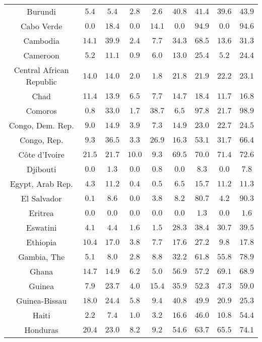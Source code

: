 \begin{longtable}{ccccccccc}
Burundi & $5.4$ & $5.4$ & $2.8$ & $2.6$ & $40.8$ & $41.4$ & $39.6$ & $43.9$ \\ 
Cabo Verde & $0.0$ & $18.4$ & $0.0$ & $14.1$ & $0.0$ & $94.9$ & $0.0$ & $94.6$ \\ 
Cambodia & $14.1$ & $39.9$ & $2.4$ & $7.7$ & $34.3$ & $68.5$ & $13.6$ & $31.3$ \\ 
Cameroon & $5.2$ & $11.1$ & $0.9$ & $6.0$ & $13.0$ & $25.4$ & $5.2$ & $24.4$ \\ 
Central African Republic & $14.0$ & $14.0$ & $2.0$ & $1.8$ & $21.8$ & $21.9$ & $22.2$ & $23.1$ \\ 
Chad & $11.4$ & $13.9$ & $6.5$ & $7.7$ & $14.7$ & $18.4$ & $11.7$ & $16.8$ \\ 
Comoros & $0.8$ & $33.0$ & $1.7$ & $38.7$ & $6.5$ & $97.8$ & $21.7$ & $98.9$ \\ 
Congo, Dem. Rep. & $9.0$ & $14.9$ & $3.9$ & $7.3$ & $14.9$ & $23.0$ & $22.7$ & $24.5$ \\ 
Congo, Rep. & $9.3$ & $36.5$ & $3.3$ & $26.9$ & $16.3$ & $53.1$ & $31.7$ & $66.4$ \\ 
Côte d'Ivoire & $21.5$ & $21.7$ & $10.0$ & $9.3$ & $69.5$ & $70.0$ & $71.4$ & $72.6$ \\ 
Djibouti & $0.0$ & $1.3$ & $0.0$ & $0.8$ & $0.0$ & $8.3$ & $0.0$ & $7.8$ \\ 
Egypt, Arab Rep. & $4.3$ & $11.2$ & $0.4$ & $0.5$ & $6.5$ & $15.7$ & $11.2$ & $11.3$ \\ 
El Salvador & $0.1$ & $8.6$ & $0.0$ & $3.8$ & $8.2$ & $80.7$ & $4.2$ & $90.3$ \\ 
Eritrea & $0.0$ & $0.0$ & $0.0$ & $0.0$ & $0.0$ & $1.3$ & $0.0$ & $1.6$ \\ 
Eswatini & $4.1$ & $4.4$ & $1.6$ & $1.5$ & $28.3$ & $38.4$ & $30.7$ & $39.5$ \\ 
Ethiopia & $10.4$ & $17.0$ & $3.8$ & $7.7$ & $17.6$ & $27.2$ & $9.8$ & $17.8$ \\ 
Gambia, The & $5.1$ & $8.0$ & $2.8$ & $8.8$ & $32.2$ & $61.8$ & $55.8$ & $78.9$ \\ 
Ghana & $14.7$ & $14.9$ & $6.2$ & $5.0$ & $56.9$ & $57.2$ & $69.1$ & $68.9$ \\ 
Guinea & $7.9$ & $23.7$ & $4.0$ & $15.4$ & $35.9$ & $52.3$ & $47.3$ & $59.0$ \\ 
Guinea-Bissau & $18.0$ & $24.4$ & $5.8$ & $9.4$ & $40.8$ & $49.9$ & $20.9$ & $25.3$ \\ 
Haiti & $2.2$ & $7.4$ & $1.0$ & $3.2$ & $16.6$ & $46.0$ & $10.8$ & $54.4$ \\ 
Honduras & $20.4$ & $23.0$ & $8.2$ & $9.2$ & $54.6$ & $63.7$ & $65.5$ & $74.1$ \\ 

\end{longtable}
